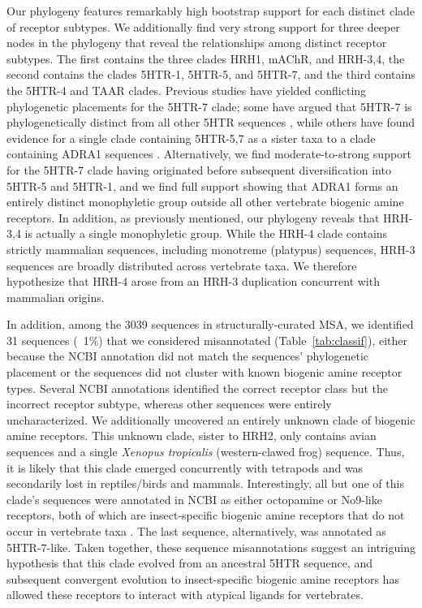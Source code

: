 \documentclass[fleqn,10pt]{wlpeerj}
\begin{document}
Our phylogeny features remarkably high bootstrap support for each distinct clade of receptor subtypes. We additionally find very strong support for three deeper nodes in the phylogeny that reveal the relationships among distinct receptor subtypes. The first contains the three clades HRH1, mAChR, and HRH-3,4, the second contains the clades 5HTR-1, 5HTR-5, and 5HTR-7, and the third contains the 5HTR-4 and TAAR clades. Previous studies have yielded conflicting phylogenetic placements for the 5HTR-7 clade; some have argued that 5HTR-7 is phylogenetically distinct from all other 5HTR sequences \citep{KakaralaJamil2014}, while others have found evidence for a single clade containing 5HTR-5,7 as a sister taxa to a clade containing ADRA1 sequences \citep{Fredrikssonetal2003}. Alternatively, we find moderate-to-strong support for the 5HTR-7 clade having originated before subsequent diversification into 5HTR-5 and 5HTR-1, and we find full support showing that ADRA1 forms an entirely distinct monophyletic group outside all other vertebrate biogenic amine receptors. In addition, as previously mentioned, our phylogeny reveals that HRH-3,4 is actually a single monophyletic group. While the HRH-4 clade contains strictly mammalian sequences, including monotreme (platypus) sequences, HRH-3 sequences are broadly distributed across vertebrate taxa. We therefore hypothesize that HRH-4 arose from an HRH-3 duplication concurrent with mammalian origins.

In addition, among the 3039 sequences in structurally-curated MSA, we identified 31 sequences (~1\%) that we considered misannotated (Table~\ref{tab:classif}), either because the NCBI annotation did not match the sequences' phylogenetic placement or the sequences did not cluster with known biogenic amine receptor types. Several NCBI annotations identified the correct receptor class but the incorrect receptor subtype, whereas other sequences were entirely uncharacterized. We additionally uncovered an entirely unknown clade of biogenic amine receptors. This unknown clade, sister to HRH2, only contains avian sequences and a single \emph{Xenopus tropicalis} (western-clawed frog) sequence. Thus, it is likely that this clade emerged concurrently with tetrapods and was secondarily lost in reptiles/birds and mammals. Interestingly, all but one of this clade's sequences were annotated in NCBI as either octopamine or No9-like receptors, both of which are insect-specific biogenic amine receptors that do not occur in vertebrate taxa \citep{Roeder2005}. The last sequence, alternatively, was annotated as 5HTR-7-like. Taken together, these sequence misannotations suggest an intriguing hypothesis that this clade evolved from an ancestral 5HTR sequence, and subsequent convergent evolution to insect-specific biogenic amine receptors has allowed these receptors to interact with atypical ligands for vertebrates.
\end{document}
